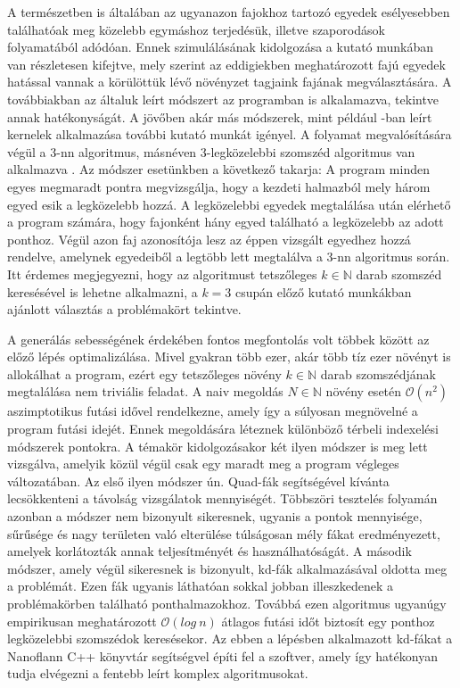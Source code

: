 A természetben is általában az ugyanazon fajokhoz tartozó egyedek esélyesebben találhatóak meg közelebb egymáshoz terjedésük, illetve szaporodások folyamatából adódóan. Ennek szimulálásának kidolgozása a \cite{Gasch2022} kutató munkában van részletesen kifejtve, mely szerint az eddigiekben meghatározott fajú egyedek hatással vannak a körülöttük lévő növényzet tagjaink fajának megválasztására. A továbbiakban az általuk leírt módszert az programban is alkalamazva, tekintve annak hatékonyságát. A jövőben akár más módszerek, mint például \cite{LanePrusinkiewicz}-ban leírt kernelek alkalmazása további kutató munkát igényel.
A folyamat megvalósítására végül a 3-nn algoritmus, másnéven 3-legközelebbi szomszéd algoritmus van alkalmazva \cite{kNN1053964}. Az módszer esetünkben a következő takarja: A program minden egyes megmaradt pontra megvizsgálja, hogy a kezdeti halmazból mely három egyed  esik a legközelebb hozzá. A legközelebbi egyedek megtalálása után elérhető a program számára, hogy fajonként hány egyed található a legközelebb az adott ponthoz. Végül azon faj azonosítója lesz az éppen vizsgált egyedhez hozzá rendelve, amelynek egyedeiből a legtöbb lett megtalálva a 3-nn algoritmus során. Itt érdemes megjegyezni, hogy az algoritmust tetszőleges $k \in \mathbb{N}$ darab szomszéd keresésével is lehetne alkalmazni, a $k = 3$ csupán előző kutató munkákban ajánlott választás a problémakört tekintve.
\newline

A generálás sebességének érdekében fontos megfontolás volt többek között az előző lépés optimalizálása. Mivel gyakran több ezer, akár több tíz ezer növényt is allokálhat a program, ezért egy tetszőleges növény $k \in \mathbb{N}$ darab szomszédjának megtalálása nem triviális feladat. A naiv megoldás $N \in \mathbb{N}$ növény esetén $\mathcal{O}(n^2)$ aszimptotikus futási idővel rendelkezne, amely így a súlyosan megnövelné a program futási idejét.
Ennek megoldására léteznek különböző térbeli indexelési módszerek pontokra. A témakör kidolgozásakor két ilyen módszer is meg lett vizsgálva, amelyik közül végül csak egy maradt meg a program végleges változatában.
Az első ilyen módszer ún. Quad-fák segítségével kívánta lecsökkenteni a távolság vizsgálatok mennyiségét\cite{Finkel1974}. Többszöri tesztelés folyamán azonban a módszer nem bizonyult sikeresnek, ugyanis a pontok mennyisége, sűrűsége és nagy területen való elterülése túlságosan mély fákat eredményezett, amelyek korlátozták annak teljesítményét és használhatóságát.
A második módszer, amely végül sikeresnek is bizonyult, kd-fák alkalmazásával oldotta meg a problémát\cite{Bentley}. Ezen fák ugyanis láthatóan sokkal jobban illeszkedenek a problémakörben található ponthalmazokhoz. Továbbá ezen algoritmus ugyanúgy empirikusan meghatározott $\mathcal{O} (log\ n)$ átlagos futási időt biztosít egy ponthoz legközelebbi szomszédok keresésekor.     
Az ebben a lépésben alkalmazott kd-fákat a Nanoflann C++ könyvtár segítségvel építi fel a szoftver, amely így hatékonyan tudja elvégezni a fentebb leírt komplex algoritmusokat.


